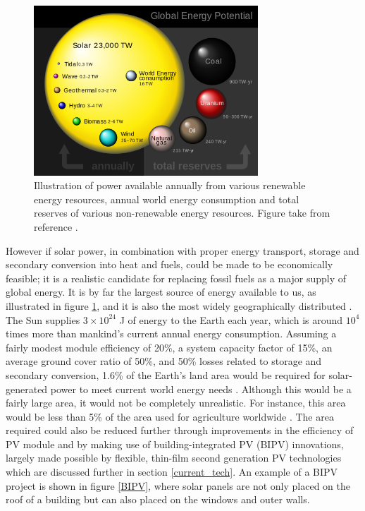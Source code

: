 \begin{figure}[h!]
  \centering
    \includegraphics[width=0.75\textwidth]{figures/global_energy.png}
    \caption{Illustration of power available annually from various renewable energy resources, annual world energy consumption and total reserves of various non-renewable energy resources. Figure take from reference .}
  \label{global_energy}
\end{figure}

However if solar power, in combination with proper energy transport, storage and secondary conversion into heat and fuels, could be made to be economically feasible; it is a realistic candidate for replacing fossil fuels as a major supply of global energy. It is by far the largest source of energy available to us, as illustrated in figure \ref{global_energy}, and it is also the most widely geographically distributed \cite{inorg_pv}. The Sun supplies $3 \times 10^{24}$ J of energy to the Earth each year, which is around $10^4$ times more than mankind's current annual energy consumption. 
Assuming a fairly modest module efficiency of 20\%, a system capacity factor of 15\%, an average ground cover ratio of 50\%, and 50\% losses related to storage and secondary conversion, 1.6\% of the Earth’s land area would be required for solar-generated power to meet current world energy needs \cite{newPVrev}. Although this would be a fairly large area, it would not be completely unrealistic. For instance, this area would be less than 5\% of the area used for agriculture worldwide \cite{newPVrev}. The area required could also be reduced further through improvements in the efficiency of PV module and by making use of building-integrated PV (BIPV) innovations, largely made possible by flexible, thin-film second generation PV technologies which are discussed further in section \ref{current_tech}. An example of a BIPV project is shown in figure \ref{BIPV}, where solar panels are not only placed on the roof of a building but can also placed on the windows and outer walls.\\ 

